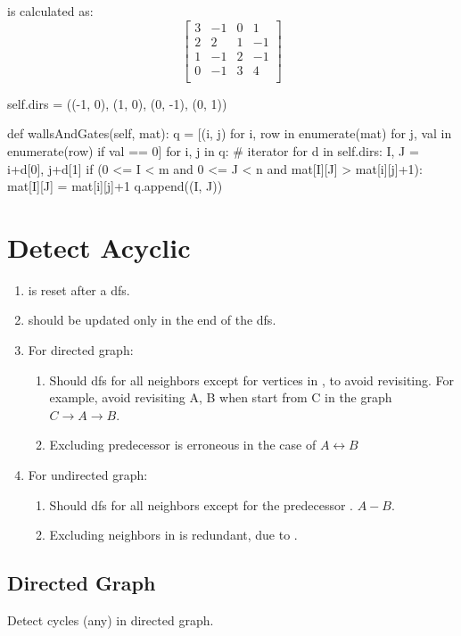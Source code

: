 is calculated as:
$$
\begin{bmatrix}
3 & -1 & 0 & 1 \\
2 & 2 & 1 & -1 \\
1 & -1 & 2 & -1 \\
0 & -1 & 3 & 4 \\
\end{bmatrix}
$$
\newpage
{}
\begin{python}
self.dirs = ((-1, 0), (1, 0), (0, -1), (0, 1))

def wallsAndGates(self, mat):
  q = [(i, j) for i, row in enumerate(mat) 
     for j, val in enumerate(row) if val == 0]
  for i, j in q:  # iterator
    for d in self.dirs:
      I, J = i+d[0], j+d[1]
      if (0 <= I < m and  0 <= J < n and 
        mat[I][J] > mat[i][j]+1):
        mat[I][J] = mat[i][j]+1
        q.append((I, J))
\end{python}


\section{Detect Acyclic}
\begin{enumerate}
\item {} is reset after a dfs. 
\item {} should be updated only in the end of the dfs. 
\item For directed graph:
\begin{enumerate}
\item Should dfs for all neighbors except for vertices in , to avoid revisiting. For example, avoid revisiting A, B when start from C in the graph $C \rightarrow A \rightarrow B$.
\item Excluding predecessor  is erroneous in the case of $A \leftrightarrow B$ 
\end{enumerate}
\item For undirected graph:
\begin{enumerate}
\item Should dfs for all neighbors except for the predecessor . $A-B$.
\item Excluding neighbors in  is redundant, due to . 
\end{enumerate}
\end{enumerate}

\subsection{Directed Graph}
Detect cycles (any) in directed graph.

